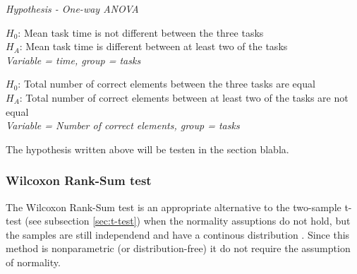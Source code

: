 \begin{framed}
		\begin{center}
			\textit{Hypothesis - One-way \textit{ANOVA}} \newline
			
			$H_{0}$: Mean task time is not different between the three tasks\\
			$H_{A}$: Mean task time is different between at least two of the tasks\\
			\textit{Variable = time, group = tasks}\newline
			
			$H_{0}$: Total number of correct elements between the three tasks are equal \\
			$H_{A}$: Total number of correct elements between at least two of the tasks are not equal \\
			\textit{Variable = Number of correct elements, group = tasks}\newline
	\end{center}
\end{framed}

The hypothesis written above will be testen in the section blabla. %



\subsubsection[Wilcoxon]{Wilcoxon Rank-Sum test}\label{sec:Wilcoxon}
The Wilcoxon Rank-Sum test is an appropriate alternative to the two-sample t-test (see subsection \ref{sec:t-test}) when the normality assuptions do not hold, but the samples are still independend and have a continous distribution \citep{Walpole2012}. Since this method is nonparametric (or distribution-free) it do not require the assumption of normality. 

